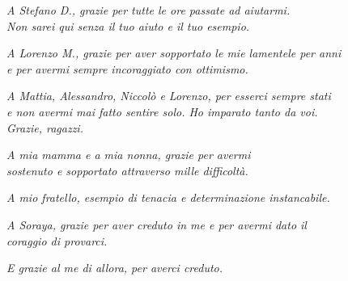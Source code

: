\documentclass[twoside,openright,titlepage,fleqn,
	headinclude,12pt,a4paper,BCOR=5mm,footinclude]{scrbook}
\begin{document}
\frenchspacing
\raggedbottom
{}
\pagestyle{plain}

\pagestyle{scrheadings}
\tableofcontents
\listoffigures
\cleardoublepage
\thispagestyle{empty}
\cleardoublepage
\thispagestyle{empty}
\vspace*{\fill}
\begin{center}
\emph{
A Stefano D., grazie per tutte le ore passate ad aiutarmi.\\
Non sarei qui senza il tuo aiuto e il tuo esempio.
} \vspace{1cm}

\emph{
A Lorenzo M., grazie per aver sopportato le mie lamentele per anni\\
e per avermi sempre incoraggiato con ottimismo.
} \vspace{1cm}

\emph{
A Mattia, Alessandro, Niccolò e Lorenzo, per esserci sempre stati\\
e non avermi mai fatto sentire solo. Ho imparato tanto da voi.\\
Grazie, ragazzi.
} \vspace{1cm}

\emph{
A mia mamma e a mia nonna, grazie per avermi\\
sostenuto e sopportato attraverso mille difficoltà.
} \vspace{1cm}

\emph{
A mio fratello, esempio di tenacia e determinazione instancabile.
} \vspace{1cm}

\emph{
A Soraya, grazie per aver creduto in me e per avermi dato il\\
coraggio di provarci.
} \vspace{1cm}

\emph{
E grazie al me di allora, per averci creduto.
}
\end{center}
\vspace*{\fill}
\cleardoublepage








\renewcommand{\bibname}{Bibliografia}
 

\end{document}
